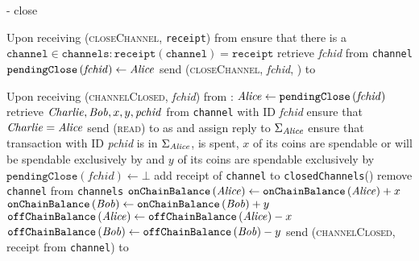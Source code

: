 \begin{systembox}{\fpaynet - close}
  \label{alg:fpaynet:close}
  \begin{algorithmic}[1]
    \State Upon receiving (\textsc{closeChannel}, \texttt{receipt}) from \alice
     
    \Indent
      \State ensure that there is a $\mathtt{channel} \in \mathtt{channels} :
      \mathtt{receipt}\left(\mathtt{channel}\right) = \mathtt{receipt}$
      \State retrieve \textit{fchid} from \texttt{channel}
      \State $\mathtt{pendingClose}\left(\mathit{fchid}\right) \gets \mathit{Alice}$
      \State send (\textsc{closeChannel}, \textit{fchid}, \alice) to \simulator
    \EndIndent
    \State

    \State Upon receiving (\textsc{channelClosed}, \textit{fchid}) from
    \simulator:
    \Indent
      \State $\mathit{Alice} \gets \mathtt{pendingClose}\left(\mathit{fchid}\right)$
      \State retrieve $\mathit{Charlie}, \mathit{Bob}, x, y, \mathit{pchid}$ from
      \texttt{channel} with ID \textit{fchid}
      \State ensure that $\mathit{Charlie}{} = \mathit{Alice}$
      \State send (\textsc{read}) to \ledger{} as \alice{} and assign reply to
      $\Sigma_{\mathit{Alice}}$
      \State ensure that transaction with ID \textit{pchid} is in
      $\Sigma_{\mathit{Alice}}$, is spent, $x$ of its coins are spendable or
      will be spendable exclusively by \alice{} and $y$ of its coins are
      spendable exclusively by \bob
      \State $\mathtt{pendingClose}\left(\mathit{fchid}\right) \gets \bot$
      \State add receipt of \texttt{channel} to \texttt{closedChannels}(\bob)
      \State remove \texttt{channel} from \texttt{channels}
      \State $\mathtt{onChainBalance}\left(\mathit{Alice}\right) \gets
      \mathtt{onChainBalance}\left(\mathit{Alice}\right) + x$
      \State $\mathtt{onChainBalance}\left(\mathit{Bob}\right) \gets
      \mathtt{onChainBalance}\left(\mathit{Bob}\right) + y$
      \State $\mathtt{offChainBalance}\left(\mathit{Alice}\right) \gets
      \mathtt{offChainBalance}\left(\mathit{Alice}\right) - x$
      \State $\mathtt{offChainBalance}\left(\mathit{Bob}\right) \gets
      \mathtt{offChainBalance}\left(\mathit{Bob}\right) - y$
      \State send (\textsc{channelClosed}, receipt from \texttt{channel}) to
      \alice
    \EndIndent
    \State
  \end{algorithmic}
\end{systembox}

